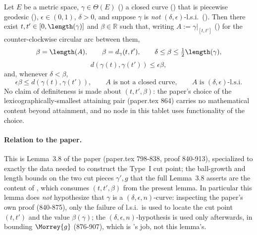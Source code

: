 \begin{lemma}
  \label{typeI-cut-point-exists}
  Let $E$ be a metric space, $\gamma \in \Theta(E)$ () a closed curve
  () that is piecewise geodesic (),
  $\epsilon \in (0,1)$, $\delta > 0$, and suppose $\gamma$ is \emph{not} $(\delta,\epsilon)$-l.s.i.\
  (). Then there exist $t,t' \in [0,\length(\gamma)]$ and $\beta \in \mathbb{R}$ such
  that, writing $A := \gamma|_{[t,t']}$ (\noderef{curveArc}) for the counter-clockwise circular arc
  between them,
  \[
    \beta = \length(A)
    ,\qquad
    \beta = d_\gamma(t,t')
    ,\qquad
    \delta \le \beta \le \tfrac{1}{2}\length(\gamma)
    ,
  \]
  \[
    d(\gamma(t),\gamma(t')) \le \epsilon\beta
    ,
  \]
  and, whenever $\delta < \beta$,
  \[
    \epsilon\beta \le d(\gamma(t),\gamma(t'))
    ,\qquad
    A \text{ is not a closed curve}
    ,\qquad
    A \text{ is } (\delta,\epsilon)\text{-l.s.i.}
  \]
  No claim of definiteness is made about $(t,t',\beta)$: the paper's choice of the
  lexicographically-smallest attaining pair (paper.tex 864) carries no mathematical content beyond
  attainment, and no node in this tablet uses functionality of the choice.

  \paragraph{Relation to the paper.} This is Lemma~3.8 of the paper (paper.tex 798-838, proof
  840-913), specialized to exactly the data needed to construct the Type~I cut point; the
  ball-growth and length bounds on the two cut pieces $\gamma',g$ that the full Lemma~3.8 asserts
  are the content of \Cref{cut-type-I}, which consumes $(t,t',\beta)$ from the present lemma. In
  particular this lemma does \emph{not} hypothesize that $\gamma$ is a $(\delta,\epsilon,n)$-curve:
  inspecting the paper's own proof (840-875), only the failure of l.s.i.\ is used to locate the cut
  point $(t,t')$ and the value $\beta(\gamma)$; the $(\delta,\epsilon,n)$-hypothesis is used only
  afterwards, in bounding $\Morrey{g}$ (876-907), which is \Cref{cut-type-I}'s job, not this
  lemma's.


\end{lemma}
